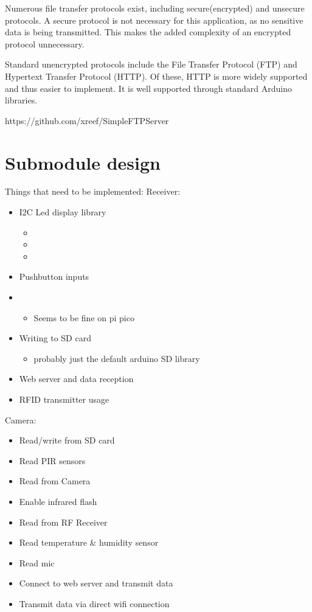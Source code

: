 Numerous file transfer protocols exist, including secure(encrypted) and unsecure protocols. A secure protocol is not necessary for this application, as no sensitive data is being transmitted. This makes the added complexity of an encrypted protocol unnecessary.

Standard unencrypted protocols include the File Transfer Protocol (FTP) and Hypertext Transfer Protocol (HTTP). Of these, HTTP is more widely supported and thus easier to implement. It is well supported through standard Arduino libraries.

https://github.com/xreef/SimpleFTPServer


\section{Submodule design}


Things that need to be implemented:
Receiver:

\begin{itemize}
    \item I2C Led display library
    \begin{itemize}
        \item %
        \item %
        \item %
    \end{itemize}
    \item Pushbutton inputs
    \item \begin{itemize}
        \item Seems to be fine on pi pico
    \end{itemize}
    \item Writing to SD card
    \begin{itemize}
        \item probably just the default arduino SD library
    \end{itemize}
    \item Web server and data reception
    \item RFID transmitter usage
\end{itemize}

Camera:
\begin{itemize}
    \item Read/write from SD card
    \item Read PIR sensors
    \item Read from Camera
    \item Enable infrared flash
    \item Read from RF Receiver
    \item Read temperature \& humidity sensor
    \item Read mic
    \item Connect to web server and transmit data
    \item Transmit data via direct wifi connection
\end{itemize}

